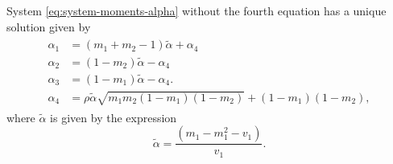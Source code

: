 \begin{proposition}
  System \eqref{eq:system-moments-alpha} without the fourth equation has a unique solution given by 
\begin{gather}
 \label{eq:system-solution}
 \begin{aligned}
  \alpha_1 &= (m_1 + m_2 - 1)\tilde{\alpha} + \alpha_4 \\
  \alpha_2 &=  (1 - m_2)\tilde{\alpha} - \alpha_4 \\
  \alpha_3 &= (1-m_1)\tilde{\alpha} - \alpha_4. \\
  \alpha_4 &= \rho\tilde{\alpha}\sqrt{m_1m_2(1-m_1)(1-m_2)} + (1-m_1)(1-m_2),
\end{aligned}
\end{gather}
where $\tilde{\alpha}$ is given by the expression 
$$
\tilde{\alpha} = \frac{(m_1 - m_1^2 - v_1)}{v_1}.
$$
\end{proposition}

